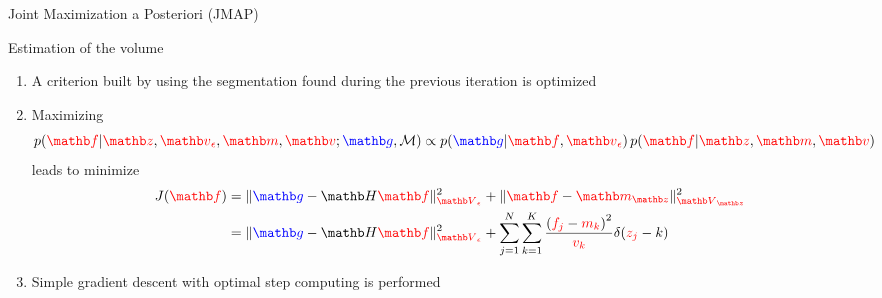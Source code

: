 \documentclass[latex]{beamer}
\def\beq{\[} \def\eeq{\]}
\begin{document}
\begin{frame}{Joint Maximization a Posteriori (JMAP)}
\begin{block}{Estimation of the volume}
\begin{enumerate}
\item A criterion built by using the segmentation found during the previous iteration is optimized
\item Maximizing
\beq
p(\rfb|\rzb, \red{\vb_{\epsilon}}, \rmb, \rvb; \bgb, \Mc)
\propto p(\bgb|\rfb,\red{\vb_{\epsilon}})\, p(\rfb|\rzb,\rmb,\rvb)
\eeq
leads to minimize
\begin{align*}
J(\rfb)&=\|\bgb-\Hb\rfb\|_{\red{\Vb_{\epsilon}}}^{2}+\|\rfb-\rmb_{\rzb}\|_{\red{\Vb_{\zb}}}^{2} \\
&=\|\bgb-\Hb\rfb\|_{\red{\Vb_{\epsilon}}}^{2}+\sum_{j=1}^{N}\sum_{k=1}^{K}\frac{\left(\red{f_{j}}-\red{m_{k}}\right)^{2}}{\red{v_{k}}}\delta(\red{z_j}-k)
\end{align*}
\item Simple gradient descent with optimal step computing is performed
\end{enumerate}
\end{block}
\end{frame}
\end{document}
